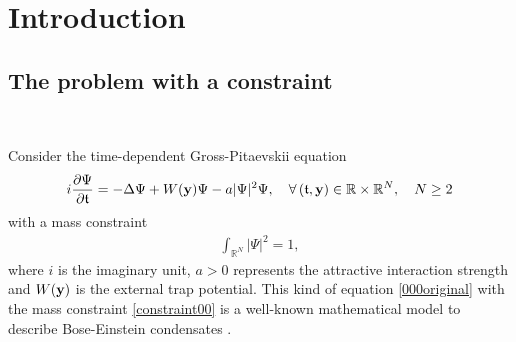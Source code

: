 \documentclass[10pt, reqno]{amsart}
\numberwithin{equation}{section}
\theoremstyle{definition}
\begin{document}
\tableofcontents



\section{Introduction}\label{Section1}


\subsection{ The problem with a constraint}\label{Section1.1}\

Consider the time-dependent Gross-Pitaevskii equation
\begin{align} \label{000original}
i \frac{\partial \Psi}{\partial {\mathfrak t}} = - \Delta
\Psi + W({\bf y} )\Psi - a |\Psi|^2\Psi, \quad \forall\, ({\mathfrak t}, {\bf y}) \in {\mathbb R}\times{\mathbb R}^N, \quad N\geq 2
\end{align}
with a mass constraint
\begin{align} \label{constraint00}
\int_{{\mathbb R}^N} |\Psi|^2 =1,
\end{align}
where $i$ is the imaginary unit, $a>0$ represents the attractive interaction strength and $W( {\bf y} )$ is the external trap potential.
This kind of equation \eqref{000original} with the mass constraint \eqref{constraint00} is a
well-known mathematical model to describe Bose-Einstein condensates
\cite{aftalionriviere, aftalionbook, Cornell, Davis, Gross, LS, Lieb2, Pethick-Smith, Pitaevskii}.
\end{document}
